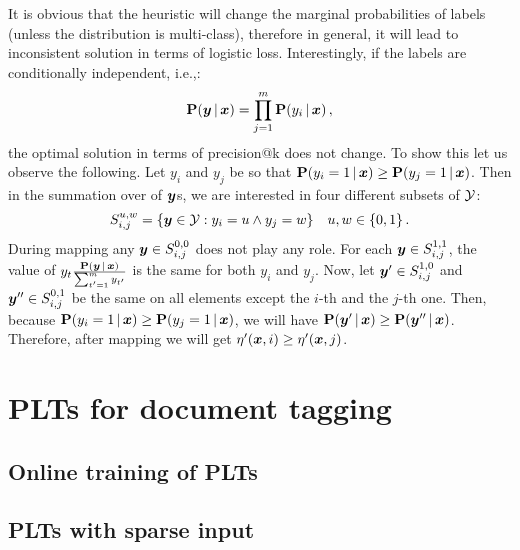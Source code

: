 \documentclass{article}
\newcommand{\prob}{\mathbf{P}}
\newcommand{\sectionBefore}{-0pt}
\newcommand{\sectionAfter}{-0pt}
\begin{document}
It is obvious that the heuristic will change the marginal probabilities of labels (unless the distribution is multi-class), therefore in general, it will lead to inconsistent solution in terms of logistic loss. 
Interestingly, if the labels are conditionally independent, i.e.,:
$$
\prob(\by \given \bx) = \prod_{j=1}^m \prob(y_i \given \bx)\,,
$$
the optimal solution in terms of precision@k does not change. To show this let us observe the following.
Let $y_i$ and $y_j$ be so that $\prob(y_i = 1 \given \bx) \ge \prob(y_j = 1 \given \bx) $. Then in the summation over of $\boldsymbol{y}$s, we are interested in four different subsets of $\mathcal{Y}$: 
$$
S_{i,j}^{u,w}  =  \{\boldsymbol{y}\in \mathcal{Y}: y_i = u \land y_j = w\} \quad u,w \in \{0,1\} \,.
$$
During mapping any $\boldsymbol{y} \in S^{0,0}_{i,j}$ does not play any role. For each $\boldsymbol{y} \in S^{1,1}_{i,j}$, the value of $y_t \frac{\prob(\by \given \bx)}{\sum_{t'=1}^m y_{t'}}$ is the same for both $y_i$ and $y_j$. Now, let $\boldsymbol{y}' \in S^{1,0}_{i,j}$ and $\boldsymbol{y}'' \in S^{0,1}_{i,j}$ be the same on all elements except the $i$-th and the $j$-th one. Then, because   $\prob(y_i = 1 \given \bx) \ge \prob(y_j = 1 \given \bx) $, we will have $\prob(\by' \given \bx) \ge \prob(\by'' \given \bx)$. Therefore, after mapping we will get $\eta'(\boldsymbol{x},i) \ge \eta'(\boldsymbol{x}, j)$. 


%
%
%




\vspace{\sectionBefore}
\section{PLTs for document tagging}
\label{sec:online_PLTs}
\vspace{\sectionAfter}



\vspace{\sectionBefore}
\subsection{Online training of PLTs}
\label{sec:online_PLTs}
\vspace{\sectionAfter}


\vspace{\sectionBefore}
\subsection{PLTs with sparse input}
\label{sec:sparse_input}
\vspace{\sectionAfter}
\end{document}
